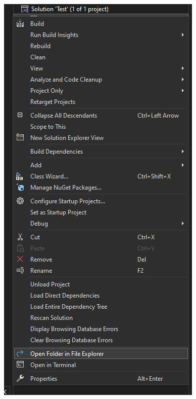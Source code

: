\documentclass[../en-fa-lab.tex]{subfiles}
\begin{document}
\includegraphics[width=\textwidth,alt={A screenshot of a computer Description automatically generated}]{./Resources/tutorial_lab9/image2.png}
\end{document}
